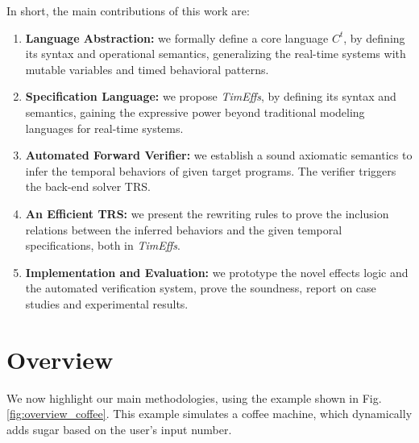 \documentclass[acmsmall,10pt,review]{acmart}
\newcommand{\timedEffects}{\emph{TimEffs}}
\newcommand{\code}[1]{{\tt{\ensuremath{\m{#1}}}}}
\newcommand{\m}{\mathit}
\newcommand\figref[1]{Fig. \textcolor{black}{\ref{#1}}.}
\newcommand{\timedL}{\code{C^{t}}}
\begin{document}
 In short, the main contributions of this work are:




\begin{enumerate}
\item \textbf{Language Abstraction:} we formally define 
a core language \timedL, by defining its syntax and operational semantics, 
generalizing the real-time systems with mutable variables and timed 
behavioral patterns. %

\item \textbf{Specification Language:} we propose \timedEffects, 
by defining its 
syntax and semantics, gaining the expressive power beyond 
traditional modeling languages for real-time systems.


 

\item \textbf{Automated Forward Verifier:} we establish a sound axiomatic 
semantics to infer the 
temporal behaviors of given target programs.  The verifier triggers the back-end 
solver TRS. 


\item \textbf{An Efficient TRS:}
we present the rewriting rules to prove the inclusion relations between the inferred 
behaviors and the given temporal specifications, both in  \timedEffects. 



\item \textbf{Implementation and Evaluation:} we prototype the novel 
effects logic and the automated verification system, 
prove the soundness, report on case studies and experimental results. 




\end{enumerate} 




\section{Overview}\label{sec:Overview}

We now highlight our main methodologies, using the example shown 
in \figref{fig:overview_coffee} This example simulates a 
coffee machine, which dynamically adds sugar based on the user's input number.  


\end{document}
